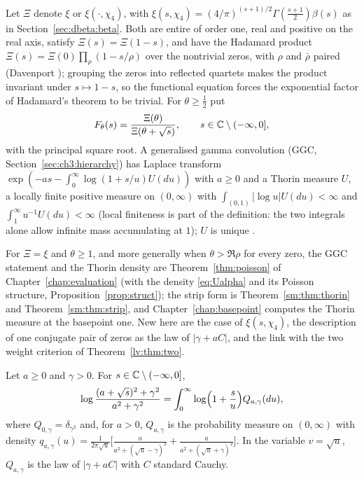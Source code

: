 Let $\Xi$ denote $\xi$ or $\xi(\cdot,\chi_4)$, with $\xi(s,\chi_4)=(4/\pi)^{(s+1)/2}\Gamma(\frac{s+1}2)\beta(s)$ as in Section~\ref{sec:dbeta:beta}. Both are entire of order one, real and positive on the real axis, satisfy $\Xi(s)=\Xi(1-s)$, and have the Hadamard product $\Xi(s)=\Xi(0)\prod_\rho(1-s/\rho)$ over the nontrivial zeros, with $\rho$ and $\bar\rho$ paired (Davenport \cite{Davenport}); grouping the zeros into reflected quartets makes the product invariant under $s\mapsto1-s$, so the functional equation forces the exponential factor of Hadamard's theorem to be trivial. For $\theta\ge\frac12$ put
\begin{equation}\label{lv:eq:Ftheta}
F_\theta(s)=\frac{\Xi(\theta)}{\Xi(\theta+\sqrt s)},\qquad s\in\mathbb{C}\setminus(-\infty,0],
\end{equation}
with the principal square root. A generalised gamma convolution (GGC, Section~\ref{sec:ch3:hierarchy}) has Laplace transform $\exp(-as-\int_0^\infty\log(1+s/u)U(du))$ with $a\ge0$ and a Thorin measure $U$, a locally finite positive measure on $(0,\infty)$ with $\int_{(0,1)}|\log u|U(du)<\infty$ and $\int_1^\infty u^{-1}U(du)<\infty$ (local finiteness is part of the definition: the two integrals alone allow infinite mass accumulating at $1$); $U$ is unique \cite{Bondesson}.

For $\Xi=\xi$ and $\theta\ge1$, and more generally when $\theta>\Re\rho$ for every zero, the GGC statement and the Thorin density are Theorem~\ref{thm:poisson} of Chapter~\ref{chap:evaluation} (with the density \eqref{eq:Ualpha} and its Poisson structure, Proposition~\ref{prop:struct}); the strip form is Theorem~\ref{sm:thm:thorin} and Theorem~\ref{sm:thm:strip}, and Chapter~\ref{chap:basepoint} computes the Thorin measure at the basepoint one. New here are the case of $\xi(s,\chi_4)$, the description of one conjugate pair of zeros as the law of $|\gamma+aC|$, and the link with the two weight criterion of Theorem~\ref{lv:thm:two}.

\begin{lemma}\label{lv:lem:pair}
Let $a\ge0$ and $\gamma>0$. For $s\in\mathbb{C}\setminus(-\infty,0]$,
\[
\log\frac{(a+\sqrt s)^2+\gamma^2}{a^2+\gamma^2}=\int_0^\infty\log\Bigl(1+\frac su\Bigr)Q_{a,\gamma}(du),
\]
where $Q_{0,\gamma}=\delta_{\gamma^2}$ and, for $a>0$, $Q_{a,\gamma}$ is the probability measure on $(0,\infty)$ with density $q_{a,\gamma}(u)=\frac1{2\pi\sqrt u}\bigl[\frac a{a^2+(\sqrt u-\gamma)^2}+\frac a{a^2+(\sqrt u+\gamma)^2}\bigr]$. In the variable $v=\sqrt u$, $Q_{a,\gamma}$ is the law of $|\gamma+aC|$ with $C$ standard Cauchy.
\end{lemma}

